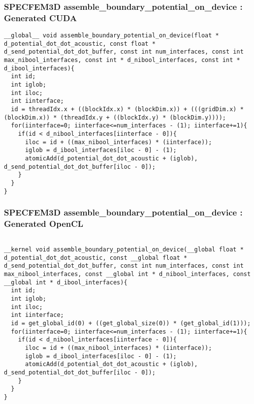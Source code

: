 \documentclass{beamer}
\begin{document}
\begin{frame}[fragile]
\frametitle{SPECFEM3D assemble\_boundary\_potential\_on\_device : Generated CUDA}
\tiny
{}
\begin{lstlisting}
__global__ void assemble_boundary_potential_on_device(float * d_potential_dot_dot_acoustic, const float * d_send_potential_dot_dot_buffer, const int num_interfaces, const int max_nibool_interfaces, const int * d_nibool_interfaces, const int * d_ibool_interfaces){
  int id;
  int iglob;
  int iloc;
  int iinterface;
  id = threadIdx.x + ((blockIdx.x) * (blockDim.x)) + (((gridDim.x) * (blockDim.x)) * (threadIdx.y + ((blockIdx.y) * (blockDim.y))));
  for(iinterface=0; iinterface<=num_interfaces - (1); iinterface+=1){
    if(id < d_nibool_interfaces[iinterface - 0]){
      iloc = id + ((max_nibool_interfaces) * (iinterface));
      iglob = d_ibool_interfaces[iloc - 0] - (1);
      atomicAdd(d_potential_dot_dot_acoustic + (iglob), d_send_potential_dot_dot_buffer[iloc - 0]);
    }
  }
}
\end{lstlisting}

\end{frame}

\begin{frame}[fragile]
\frametitle{SPECFEM3D assemble\_boundary\_potential\_on\_device : Generated OpenCL}
\tiny
{}
\begin{lstlisting}

__kernel void assemble_boundary_potential_on_device(__global float * d_potential_dot_dot_acoustic, const __global float * d_send_potential_dot_dot_buffer, const int num_interfaces, const int max_nibool_interfaces, const __global int * d_nibool_interfaces, const __global int * d_ibool_interfaces){
  int id;
  int iglob;
  int iloc;
  int iinterface;
  id = get_global_id(0) + ((get_global_size(0)) * (get_global_id(1)));
  for(iinterface=0; iinterface<=num_interfaces - (1); iinterface+=1){
    if(id < d_nibool_interfaces[iinterface - 0]){
      iloc = id + ((max_nibool_interfaces) * (iinterface));
      iglob = d_ibool_interfaces[iloc - 0] - (1);
      atomicAdd(d_potential_dot_dot_acoustic + (iglob), d_send_potential_dot_dot_buffer[iloc - 0]);
    }
  }
}
\end{lstlisting}
\end{frame}
%
%
\end{document}
